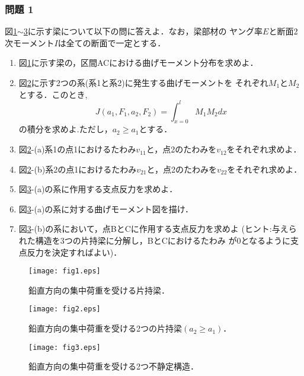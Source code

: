 \documentclass[10pt,a4j]{jarticle}
\begin{document}
\subsubsection*{問題 1}
図\ref{fig:fig1}$\sim$\ref{fig:fig3}に示す梁について以下の問に答えよ．なお，梁部材の
ヤング率$E$と断面2次モーメント$I$は全ての断面で一定とする．
\begin{enumerate}
\item
	図\ref{fig:fig1}に示す梁の，区間ACにおける曲げモーメント分布を求めよ．
\item
	図\ref{fig:fig2}に示す2つの系(系1と系2)に発生する曲げモーメントを
	それぞれ$M_1$と$M_2$とする．このとき,
	\begin{equation}
		J(a_1,F_1,a_2,F_2)=\int_{x=0}^{l}M_1M_2 dx
	\end{equation}
	の積分を求めよ.ただし，$a_2\geq a_1$とする．
\item
	図\ref{fig:fig2}-(a)系1の点1におけるたわみ$v_{11}$と，点2のたわみを$v_{12}$をそれぞれ求めよ．
\item
	図\ref{fig:fig2}-(b)系2の点1におけるたわみ$v_{21}$と，点2のたわみを$v_{22}$をそれぞれ求めよ．
\item
	図\ref{fig:fig3}-(a)の系に作用する支点反力を求めよ．
\item
	図\ref{fig:fig3}-(a)の系に対する曲げモーメント図を描け．
\item
	図\ref{fig:fig3}-(b)の系において，点BとCに作用する支点反力を求めよ
	({\small ヒント:与えられた構造を3つの片持梁に分解し，BとCにおけるたわみ
	が0となるように支点反力を決定すればよい})．
\end{enumerate}
\begin{figure}[h]
	\begin{center}
	\texttt{[image: fig1.eps]} 
	\end{center}
	\caption{鉛直方向の集中荷重を受ける片持梁．} 
	\label{fig:fig1}
\end{figure}
\begin{figure}[h]
	\begin{center}
	\texttt{[image: fig2.eps]} 
	\end{center}
	\caption{鉛直方向の集中荷重を受ける2つの片持梁$(a_2\geq a_1)$．} 
	\label{fig:fig2}
\end{figure}
\begin{figure}[h]
	\begin{center}
	\texttt{[image: fig3.eps]} 
	\end{center}
	\caption{鉛直方向の集中荷重を受ける2つ不静定構造．} 
	\label{fig:fig3}
\end{figure}
\clearpage
\end{document}
